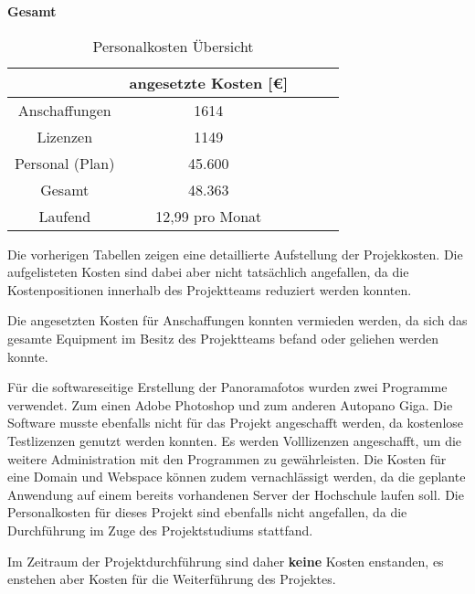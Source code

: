 

\textbf{Gesamt}

\begin{table}[h]
\centering
\begin{tabular}{ccccl}
\hline
\multicolumn{1}{l}{}      & angesetzte Kosten {[}€{]}   \\ \hline
Anschaffungen             & 1614                        \\ \hline
Lizenzen                  & 1149                        \\ \hline
Personal (Plan)           & 45.600                      \\ \hline

Gesamt                    & 48.363                      \\ \hline
Laufend                   & 12,99 pro Monat             \\ \hline

\end{tabular}
\caption{Personalkosten Übersicht}%
\label{tab:KostenaufstellungPersonal}%
\end{table}

Die vorherigen Tabellen zeigen eine detaillierte Aufstellung der Projekkosten.
Die aufgelisteten Kosten sind dabei aber nicht tatsächlich angefallen, da die
Kostenpositionen innerhalb des Projektteams reduziert werden konnten.

Die angesetzten Kosten für Anschaffungen konnten vermieden werden, 
da sich das gesamte Equipment im Besitz des Projektteams befand oder 
geliehen werden konnte.

Für die softwareseitige Erstellung der Panoramafotos wurden
zwei Programme verwendet. Zum einen Adobe Photoshop und zum anderen Autopano Giga. 
Die Software musste ebenfalls nicht für das Projekt angeschafft werden, da kostenlose
Testlizenzen genutzt werden konnten. Es 
werden Volllizenzen angeschafft, um die weitere Administration mit den Programmen zu gewährleisten.
Die Kosten für eine Domain und Webspace können zudem vernachlässigt werden, da die geplante Anwendung auf einem bereits 
vorhandenen Server der Hochschule laufen soll.
Die Personalkosten für dieses Projekt sind ebenfalls nicht angefallen, da die Durchführung im Zuge des Projektstudiums 
stattfand.

Im Zeitraum der Projektdurchführung sind daher \textbf{keine} Kosten enstanden, es enstehen aber
Kosten für die Weiterführung des Projektes.
